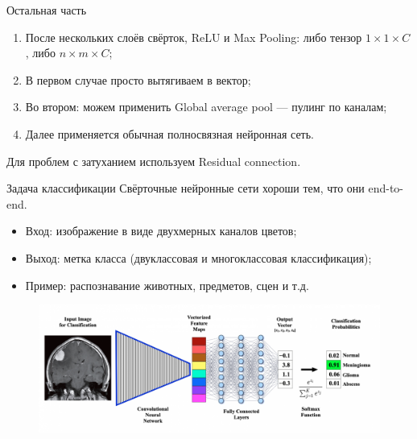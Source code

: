 \documentclass[notheorems, handout]{beamer}
\begin{document}
\begin{frame}{Остальная часть}
    \begin{enumerate}
        \item После нескольких слоёв свёрток, ReLU и Max Pooling: либо тензор $1 \times 1 \times C$, либо $n \times m \times C$;
        \item В первом случае просто вытягиваем в вектор;
        \item Во втором: можем применить Global average pool --- пулинг по каналам;
        \item Далее применяется обычная полносвязная нейронная сеть.
    \end{enumerate}

    Для проблем с затуханием используем Residual connection.
\end{frame}

\begin{frame}{Задача классификации}
    Свёрточные нейронные сети хороши тем, что они end-to-end.

    \begin{itemize}
        \item Вход: изображение в виде двухмерных каналов цветов;
        \item Выход: метка класса (двуклассовая и многоклассовая классификация);
        \item Пример: распознавание животных, предметов, сцен и т.д.
    \end{itemize}

    \begin{figure}
        \includegraphics[width=\linewidth]{img/conv_classification.png}        
    \end{figure}
\end{frame}
\end{document}

